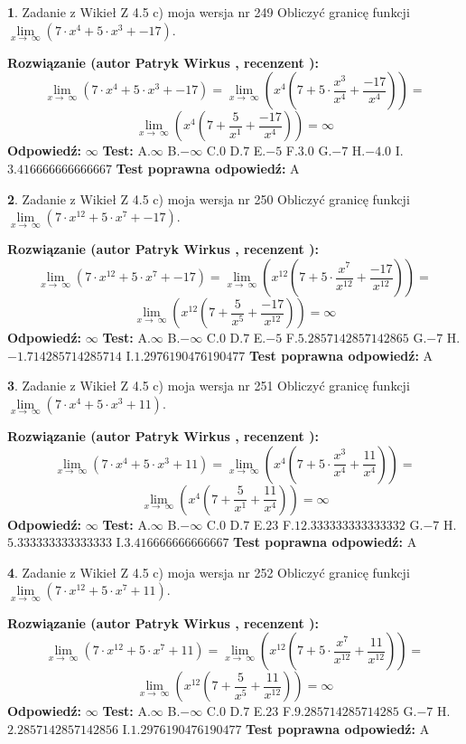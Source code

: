 \documentclass[12pt, a4paper]{article}
\theoremstyle{definition} %
\newtheorem{zad}{}
\newcommand{\zadStart}[1]{\begin{zad}#1\newline}
\newcommand{\zadStop}{\end{zad}}
\newcommand{\rozwStart}[2]{\noindent \textbf{Rozwiązanie (autor #1 , recenzent #2): }\newline}
\newcommand{\rozwStop}{\newline}
\newcommand{\odpStart}{\noindent \textbf{Odpowiedź:}\newline}
\newcommand{\odpStop}{\newline}
\newcommand{\testStart}{\noindent \textbf{Test:}\newline}
\newcommand{\testStop}{\newline}
\newcommand{\kluczStart}{\noindent \textbf{Test poprawna odpowiedź:}\newline}
\newcommand{\kluczStop}{\newline}
\begin{document}
\zadStart{Zadanie z Wikieł Z 4.5 c) moja wersja nr 249}
Obliczyć granicę funkcji  $\lim\limits_{x\to\ \infty}(7 \cdot x^{4}+5 \cdot x^{3}+-17)$.
\zadStop
\rozwStart{Patryk Wirkus}{}
$$\lim\limits_{x\to\ \infty}(7 \cdot x^{4}+5 \cdot x^{3}+-17) = \lim\limits_{x\to\ \infty}(x^{4}(7 +5 \cdot \frac{x^{3}}{x^{4}}+\frac{-17}{x^{4}})) =$$ $$\lim\limits_{x\to\ \infty}(x^{4}(7 +\frac{5}{x^{1}}+\frac{-17}{x^{4}})) =\infty$$
\rozwStop
\odpStart
$\infty$
\odpStop
\testStart
A.$\infty$ B.$-\infty$ C.$0$ D.$7$ E.$-5$
F.$3.0$ G.$-7$
H.$-4.0$
I.$3.416666666666667$
\testStop
\kluczStart
A
\kluczStop



\zadStart{Zadanie z Wikieł Z 4.5 c) moja wersja nr 250}
Obliczyć granicę funkcji  $\lim\limits_{x\to\ \infty}(7 \cdot x^{12}+5 \cdot x^{7}+-17)$.
\zadStop
\rozwStart{Patryk Wirkus}{}
$$\lim\limits_{x\to\ \infty}(7 \cdot x^{12}+5 \cdot x^{7}+-17) = \lim\limits_{x\to\ \infty}(x^{12}(7 +5 \cdot \frac{x^{7}}{x^{12}}+\frac{-17}{x^{12}})) =$$ $$\lim\limits_{x\to\ \infty}(x^{12}(7 +\frac{5}{x^{5}}+\frac{-17}{x^{12}})) =\infty$$
\rozwStop
\odpStart
$\infty$
\odpStop
\testStart
A.$\infty$ B.$-\infty$ C.$0$ D.$7$ E.$-5$
F.$5.2857142857142865$ G.$-7$
H.$-1.714285714285714$
I.$1.2976190476190477$
\testStop
\kluczStart
A
\kluczStop



\zadStart{Zadanie z Wikieł Z 4.5 c) moja wersja nr 251}
Obliczyć granicę funkcji  $\lim\limits_{x\to\ \infty}(7 \cdot x^{4}+5 \cdot x^{3}+11)$.
\zadStop
\rozwStart{Patryk Wirkus}{}
$$\lim\limits_{x\to\ \infty}(7 \cdot x^{4}+5 \cdot x^{3}+11) = \lim\limits_{x\to\ \infty}(x^{4}(7 +5 \cdot \frac{x^{3}}{x^{4}}+\frac{11}{x^{4}})) =$$ $$\lim\limits_{x\to\ \infty}(x^{4}(7 +\frac{5}{x^{1}}+\frac{11}{x^{4}})) =\infty$$
\rozwStop
\odpStart
$\infty$
\odpStop
\testStart
A.$\infty$ B.$-\infty$ C.$0$ D.$7$ E.$23$
F.$12.333333333333332$ G.$-7$
H.$5.333333333333333$
I.$3.416666666666667$
\testStop
\kluczStart
A
\kluczStop



\zadStart{Zadanie z Wikieł Z 4.5 c) moja wersja nr 252}
Obliczyć granicę funkcji  $\lim\limits_{x\to\ \infty}(7 \cdot x^{12}+5 \cdot x^{7}+11)$.
\zadStop
\rozwStart{Patryk Wirkus}{}
$$\lim\limits_{x\to\ \infty}(7 \cdot x^{12}+5 \cdot x^{7}+11) = \lim\limits_{x\to\ \infty}(x^{12}(7 +5 \cdot \frac{x^{7}}{x^{12}}+\frac{11}{x^{12}})) =$$ $$\lim\limits_{x\to\ \infty}(x^{12}(7 +\frac{5}{x^{5}}+\frac{11}{x^{12}})) =\infty$$
\rozwStop
\odpStart
$\infty$
\odpStop
\testStart
A.$\infty$ B.$-\infty$ C.$0$ D.$7$ E.$23$
F.$9.285714285714285$ G.$-7$
H.$2.2857142857142856$
I.$1.2976190476190477$
\testStop
\kluczStart
A
\kluczStop
\end{document}
